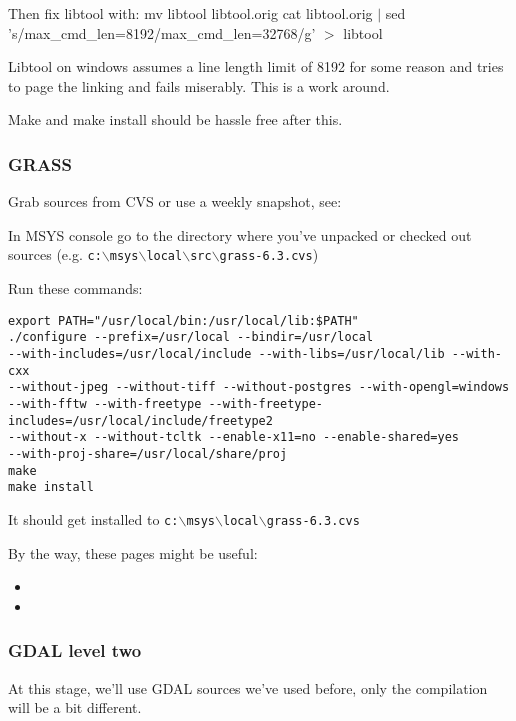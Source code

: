 Then fix libtool with:
mv libtool libtool.orig
cat libtool.orig $|$ sed 's/max\_cmd\_len=8192/max\_cmd\_len=32768/g' $>$ libtool

Libtool on windows assumes a line length limit of 8192 for some reason and tries to page the linking and fails miserably. This is a work around.

Make and make install should be hassle free after this.

\subsubsection{GRASS}
Grab sources from CVS or use a weekly snapshot, see:

	\begin{quotation}
	\end{quotation}

In MSYS console go to the directory where you've unpacked or checked out sources
(e.g. \texttt{c:$\backslash$msys$\backslash$local$\backslash$src$\backslash$grass-6.3.cvs})

Run these commands:

\begin{verbatim}
export PATH="/usr/local/bin:/usr/local/lib:$PATH"
./configure --prefix=/usr/local --bindir=/usr/local 
--with-includes=/usr/local/include --with-libs=/usr/local/lib --with-cxx 
--without-jpeg --without-tiff --without-postgres --with-opengl=windows 
--with-fftw --with-freetype --with-freetype-includes=/usr/local/include/freetype2 
--without-x --without-tcltk --enable-x11=no --enable-shared=yes 
--with-proj-share=/usr/local/share/proj
make
make install
\end{verbatim}

It should get installed to \texttt{c:$\backslash$msys$\backslash$local$\backslash$grass-6.3.cvs}

By the way, these pages might be useful:

\begin{itemize}
\item {}
\item {}
\end{itemize}

\subsubsection{GDAL level two}
At this stage, we'll use GDAL sources we've used before, only the compilation will be a bit different.

